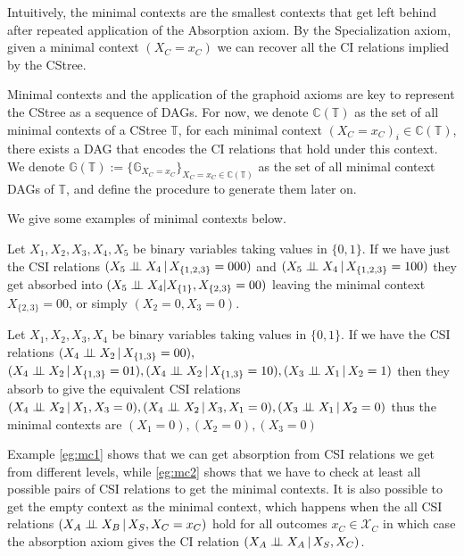 \documentclass{tufte-book}
\begin{document}
\begin{Definition}
Intuitively, the minimal contexts are the smallest contexts that get left behind after repeated application of the Absorption axiom. By the Specialization axiom, given a minimal context \((X_C=x_C)\) we can recover all the CI relations implied by the CStree.

Minimal contexts and the application of the graphoid axioms are key to represent the CStree as a sequence of DAGs. For now, we denote \(\mathbb{C}(\mathbb{T})\) as the set of all minimal contexts of a CStree \(\mathbb{T}\), for each minimal context \((X_C=x_C)_i \in \mathbb{C}(\mathbb{T})\), there exists a DAG that encodes the CI relations that hold under this context.  We denote \(\mathbb{G}(\mathbb{T}) := \{ \mathbb{G}_{X_C=x_C} \}_{X_C=x_C \in \mathbb{C}(\mathbb{T})}\) as the set of all minimal context DAGs of \(\mathbb{T}\), and define the procedure to generate them later on.


We give some examples of minimal contexts below.

\begin{example}\label{eg:mc1}
Let $X_1,X_2,X_3,X_4,X_5$ be binary variables taking values in $\{0,1\}$. If we have just the CSI relations $(X_5 \perp \!\!\! \perp X_4 \,|\, X_{\{1,2,3\}}=000)$ and $(X_5 \perp \!\!\! \perp X_4 \,|\, X_{\{1,2,3\}}=100)$ they get absorbed into $(X_5 \perp \!\!\! \perp X_4 | X_{\{1\}}, X_{\{2,3\}}=00)$ leaving the minimal context $X_{\{2,3\}}=00$, or simply $(X_2 = 0, X_3=0)$.
\end{example}

\begin{example}\label{eg:mc2}
Let $X_1,X_2,X_3,X_4$ be binary variables taking values in $\{0,1\}$. If we have the  CSI relations $(X_4 \perp \!\!\! \perp X_2 \,|\, X_{\{1,3\}}=00), $\\$ (X_4 \indep X_2 \,|\, X_{\{1,3\}}=01), (X_4 \indep X_2 \,|\, X_{\{1,3\}}=10), (X_3 \indep X_1 \,|\, X_2=1)$ then they absorb to give the equivalent CSI relations $(X_4 \indep X_2 \, |\,X_1, X_3=0), (X_4 \indep X_2 \,|\, X_3, X_1=0), (X_3 \indep X_1 \,|\,X_2=0)$ thus the minimal contexts are $(X_1=0),(X_2=0),(X_3=0)$
\end{example}

Example \ref{eg:mc1} shows that we can get absorption from CSI relations we get from different levels, while \ref{eg:mc2} shows that we have to check at least all possible pairs of CSI relations to get the minimal contexts. It is also possible to get the empty context as the minimal context, which happens when the all CSI relations \((X_A \perp \!\!\! \perp X_B \,|\, X_S, X_C=x_C)\) hold for all outcomes \(x_C \in \mathcal{X}_C\) in which case the absorption axiom gives the CI relation \((X_A \perp \!\!\! \perp X_A\,|\,X_S,X_C)\).



\end{Definition}
\end{document}
